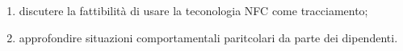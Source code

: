 \begin{enumerate}
    \item discutere la fattibilità di usare la teconologia NFC come tracciamento;
    \item approfondire situazioni comportamentali paritcolari da parte dei dipendenti.
\end{enumerate}